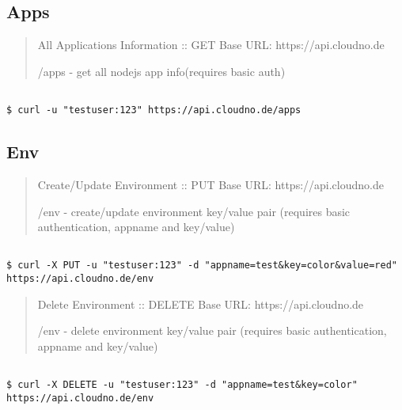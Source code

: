 \subsection{Apps}
\label{apps}

\begin{quote}

All Applications Information :: GET
Base URL: https:/\slash api.cloudno.de

\slash apps - get all nodejs app info(requires basic auth)
\end{quote}

\begin{adjustwidth}{2.5em}{2.5em}
\begin{verbatim}

$ curl -u "testuser:123" https://api.cloudno.de/apps

\end{verbatim}
\end{adjustwidth}



\subsection{Env}
\label{env}

\begin{quote}

Create\slash Update Environment :: PUT
Base URL: https:/\slash api.cloudno.de

\slash env - create\slash update environment key\slash value pair (requires basic authentication, appname and key\slash value)
\end{quote}

\begin{adjustwidth}{2.5em}{2.5em}
\begin{verbatim}

$ curl -X PUT -u "testuser:123" -d "appname=test&key=color&value=red" https://api.cloudno.de/env

\end{verbatim}
\end{adjustwidth}

\begin{quote}

Delete Environment :: DELETE
Base URL: https:/\slash api.cloudno.de

\slash env - delete environment key\slash value pair (requires basic authentication, appname and key\slash value)
\end{quote}

\begin{adjustwidth}{2.5em}{2.5em}
\begin{verbatim}

$ curl -X DELETE -u "testuser:123" -d "appname=test&key=color" https://api.cloudno.de/env

\end{verbatim}
\end{adjustwidth}

